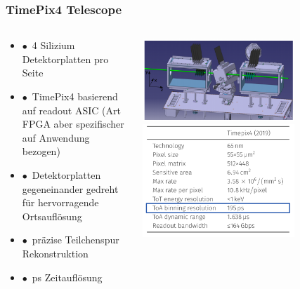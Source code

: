 \documentclass[aspectratio=1610, 12pt, xcolor=dvipsnames]{beamer}
\begin{document}
\begin{frame}\frametitle{TimePix4 Telescope}
  \begin{columns}
    \begin{column}[c]{0.48\textwidth}
      \begin{itemize}
        \item $\bullet$\, 4 Silizium Detektorplatten pro Seite
        \item $\bullet$\, TimePix4 basierend auf readout ASIC (Art FPGA aber spezifischer auf Anwendung bezogen)
        \item $\bullet$\, Detektorplatten gegeneinander gedreht für hervorragende Ortsauflösung
        \item $\bullet$\, \to präzise Teilchenspur Rekonstruktion
        \item $\bullet$\,  ps Zeitauflösung
      \end{itemize}
    \end{column}
    \begin{column}[c]{0.48\textwidth}
      \includegraphics[width=0.7\textwidth]{plots/timepix4.png}
      \includegraphics[width=0.7\textwidth]{plots/lumi_res.png}
    \end{column}
  \end{columns}
\end{frame}

%
%
\end{document}
